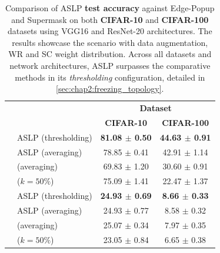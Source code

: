 \begin{table}[htbp]
  \centering\begin{tabular}{llcc}
    \cmidrule[\heavyrulewidth]{3-4}
                                                          &                                                  & \multicolumn{2}{c}{\textbf{Dataset}}                             \\
                                                          &                                                  & \textbf{CIFAR-10}                    & \textbf{CIFAR-100}        \\
    \toprule
    \multirow{6}{*}{} \multirow{4}{*}{\textbf{ResNet-20}} & \ac{ASLP} (thresholding)                              & \textbf{ 81.08 $\pm$ 0.50}           & \textbf{44.63 $\pm$ 0.91} \\
                                                          & \ac{ASLP} (averaging)                                 & 78.85 $\pm$ 0.41                     & 42.91 $\pm$ 1.14          \\
                                                          & \cite{DBLP:conf/nips/ZhouLLY19} (averaging)      & 69.83 $\pm$ 1.20                     & 30.60 $\pm$ 0.91          \\
                                                          & \cite{DBLP:conf/cvpr/RamanujanWKFR20} ($k=50\%$) & 75.09 $\pm$ 1.41                     & 22.47 $\pm$ 1.37          \\
    \midrule
    \multirow{4}{*}{\textbf{VGG16}}                       & \ac{ASLP} (thresholding)                              & \textbf{24.93 $\pm$ 0.69}            & \textbf{8.66 $\pm$ 0.33}  \\
                                                          & \ac{ASLP} (averaging)                                 & 24.93 $\pm$ 0.77                     & 8.58 $\pm$ 0.32           \\
                                                          & \cite{DBLP:conf/nips/ZhouLLY19} (averaging)      & 25.07 $\pm$ 0.34                     & 7.97 $\pm$ 0.35           \\
                                                          & \cite{DBLP:conf/cvpr/RamanujanWKFR20} ($k=50\%$) & 23.05 $\pm$ 0.84                     & 6.65 $\pm$ 0.38           \\
    \bottomrule
  \end{tabular}
  \caption{Comparison of \ac{ASLP} \textbf{test accuracy} against Edge-Popup and
    Supermask \cite{DBLP:conf/cvpr/RamanujanWKFR20,DBLP:conf/nips/ZhouLLY19} on
    both \textbf{CIFAR-10} and \textbf{CIFAR-100} datasets using VGG16 and
    ResNet-20 architectures. The results showcase the scenario with data
    augmentation, \acf{WR} and \acf{SC} weight distribution. Across all datasets
    and network architectures, \ac{ASLP} surpasses the comparative methods in its
    \textit{thresholding} configuration, detailed in
    \cref{sec:chap2:freezing_topology}.}
  \label{tab:chap2:r20_VGG16_performances_comparison}
\end{table}

